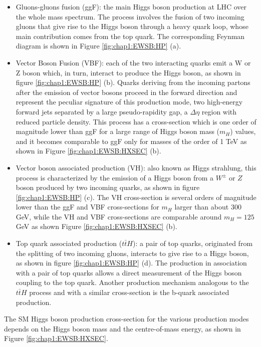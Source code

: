 \begin{itemize}
	\item Gluons-gluons fusion (ggF): the main Higgs boson production at LHC over the whole mass spectrum. The process involves the fusion of two incoming gluons that give rise to the Higgs boson through a heavy quark loop, whose main contribution comes from the top quark. The corresponding Feynman diagram is shown in Figure \ref{fig:chap1:EWSB:HP} (a).  
	\item Vector Boson Fusion (VBF): each of the two interacting quarks emit a W or Z boson which, in turn, interact to produce the Higgs boson, as shown in figure \ref{fig:chap1:EWSB:HP} (b). Quarks deriving from the incoming partons after the emission of vector bosons proceed in the forward direction and represent the peculiar signature of this production mode, two high-energy forward jets separated by a large pseudo-rapidity gap, a $\Delta\eta$ region with reduced particle density. This process has a cross-section which is one order of magnitude lower than ggF for a large range of Higgs boson mass ($m_H$) values, and it becomes comparable to ggF only for masses of the order of 1 TeV as shown in Figure \ref{fig:chap1:EWSB:HXSEC} (b).
	\item Vector boson associated production (VH): also known as Higgs strahlung, this process is characterized by the emission of a Higgs boson from a $W^{\pm}$ or $Z$ boson produced by two incoming quarks, as shown in figure \ref{fig:chap1:EWSB:HP} (c). The VH cross-section is several orders of magnitude lower than the ggF and VBF cross-sections for $m_H$ larger than about 300 GeV, while the VH and VBF cross-sections are comparable around $m_H = 125$ GeV as shown Figure \ref{fig:chap1:EWSB:HXSEC} (b).
	\item Top quark associated production ($t\bar{t}H$): a pair of top quarks, originated from the splitting of two incoming gluons, interacts to give rise to a Higgs boson, as shown in figure \ref{fig:chap1:EWSB:HP} (d). The production in association with a pair of top quarks allows a direct measurement of the Higgs boson coupling to the top quark. Another production mechanism analogous to the $t\bar{t}H$ process and with a similar cross-section is the b-quark associated production.
\end{itemize}
The SM Higgs boson production cross-section for the various production modes depends on the Higgs boson mass and the centre-of-mass energy, as shown in Figure \ref{fig:chap1:EWSB:HXSEC}. 
